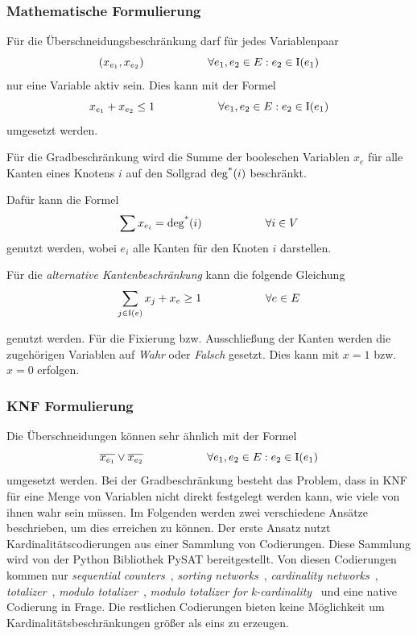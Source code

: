 \subsubsection{Mathematische Formulierung}
\label{sec:kanten_formulierung:mathematisch}
Für die Überschneidungsbeschränkung darf für jedes Variablenpaar 
\[
	(x_{e_1}, x_{e_2}) \hspace{2cm} \forall e_1, e_2 \in E : e_2 \in \operatorname{I}(e_1)
\]nur eine Variable aktiv sein.
Dies kann mit der Formel 
\[
	x_{e_1} + x_{e_2} \leq 1 \hspace{2cm} \forall e_1, e_2 \in E : e_2 \in \operatorname{I}(e_1)
\]
umgesetzt werden. 

Für die Gradbeschränkung wird die Summe der booleschen Variablen \(x_e\) für alle Kanten eines Knotens \(i\) auf den Sollgrad \(\operatorname{deg^*}(i)\) beschränkt.

Dafür kann die Formel
\[
	\sum x_{e_i} = \operatorname{deg^*}(i) \hspace{2cm} \forall i \in V
\]
genutzt werden, wobei \(e_i\) alle Kanten für den Knoten \(i\) darstellen.

Für die \emph{alternative Kantenbeschränkung} kann die folgende Gleichung 
\[
	\sum_{j \in \operatorname{I}(e)}{x_{j}} + x_e \geq 1 \hspace{2cm} \forall e \in E
\]

genutzt werden. Für die Fixierung bzw. Ausschließung der Kanten werden die zugehörigen Variablen auf \emph{Wahr} oder \emph{Falsch} gesetzt.
Dies kann mit \(x = 1\) bzw. \( x=0\) erfolgen.

\subsubsection{KNF Formulierung}
\label{sec:kanten_formulierung:knf}
Die Überschneidungen können sehr ähnlich mit der Formel
\[
\overline{x_{e_1}} \lor \overline{x_{e_2}} \hspace{2cm} \forall e_1, e_2 \in E: e_2 \in \operatorname{I}(e_1)
\]
 umgesetzt werden.
 Bei der Gradbeschränkung besteht das Problem, dass in KNF für eine Menge von Variablen nicht direkt festgelegt werden kann, wie viele von ihnen wahr sein müssen.
Im Folgenden werden zwei verschiedene Ansätze beschrieben, um dies erreichen zu können.
Der erste Ansatz nutzt Kardinalitätscodierungen aus einer Sammlung von Codierungen.
Diese Sammlung wird von der Python Bibliothek PySAT bereitgestellt.
Von diesen Codierungen kommen nur \emph{sequential counters}~\cite{sequential_counters}, \emph{sorting networks}~\cite{sorting_networks}, \emph{cardinality networks}~\cite{cardinality_networks}, \emph{totalizer}~\cite{totalizer}, \emph{modulo totalizer}~\cite{modulo_totalizer}, \emph{modulo totalizer for k-cardinality}~\cite{modulo_totalizer_for_k_cardinality} und eine native Codierung in Frage.
Die restlichen Codierungen bieten keine Möglichkeit um Kardinalitätsbeschränkungen größer als eins zu erzeugen. 

